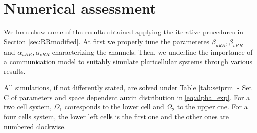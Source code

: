 \section{Numerical assessment}\label{cap3:results}
We here show some of the results obtained applying the iterative procedures in Section \ref{sec:RRmodified}. At first we properly tune the parameteres $\beta_{uRR}, \beta_{vRR}$ and $\alpha_{uRR}, \alpha_{vRR}$ characterizing the channels. Then, we underline the importance of a communication model to suitably simulate pluricellular systems through various results.

All simulations, if not differently stated, are solved under Table \ref{tab:setprm} - Set C of parameters and space dependent auxin distribution in \eqref{eq:alpha_exp}. For a two cell system, $\Omega_1$ corresponds to the lower cell and $\Omega_2$ to the upper one. For a four cells system, the lower left cells is the first one and the other ones are numbered clockwise.

